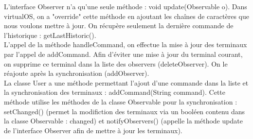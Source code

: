 L'interface Observer n'a qu'une seule méthode : void update(Observable o). Dans virtualOS, on a "override" cette méthode en ajoutant les chaînes de caractères que nous voulons mettre à jour. On récupère seulement la dernière commande de l'historique : getLastHistoric().\\

L'appel de la méthode handleCommand, on effectue la mise à jour des terminaux par l'appel de addCommand. Afin d'éviter une mise à jour du terminal courant, on supprime ce terminal dans la liste des observers (deleteObserver). On le réajoute après la synchronisation (addObserver).\\

La classe User a une méthode permettant l'ajout d'une commande dans la liste et la synchronisation des terminaux : addCommand(String command). Cette méthode utilise les méthodes de la classe Observable pour la synchronisation : setChanged() (permet la modifiction des terminaux via un booléen contenu dans la classe Observable : changed) et notifyObservers() (appelle la méthode update de l'interface Observer afin de mettre à jour les terminaux).